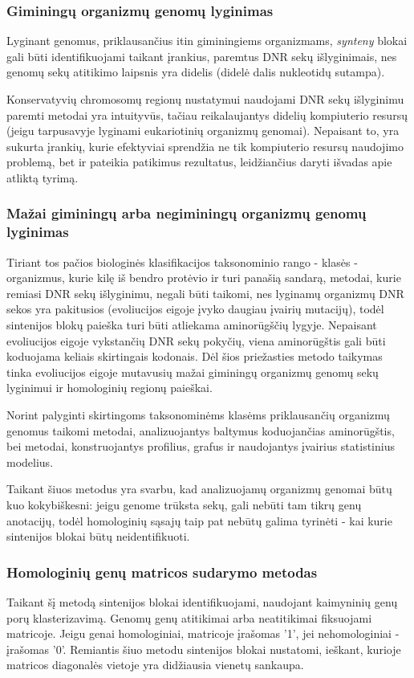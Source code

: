 \documentclass[12pt]{article}
\begin{document}
\subsubsection{Giminingų organizmų genomų lyginimas}
Lyginant genomus, priklausančius itin giminingiems organizmams, \emph{synteny}
blokai gali būti identifikuojami taikant įrankius, paremtus DNR sekų
išlyginimais, nes genomų sekų atitikimo laipsnis yra didelis (didelė dalis
nukleotidų sutampa).

Konservatyvių chromosomų regionų nustatymui naudojami DNR sekų išlyginimu
paremti metodai yra intuityvūs, tačiau reikalaujantys didelių kompiuterio
resursų (jeigu tarpusavyje lyginami eukariotinių organizmų genomai). Nepaisant
to, yra sukurta įrankių, kurie efektyviai sprendžia ne tik kompiuterio resursų
naudojimo problemą, bet ir pateikia patikimus rezultatus, leidžiančius daryti
išvadas apie atliktą tyrimą.

\subsubsection{Mažai giminingų arba negiminingų organizmų genomų lyginimas}
Tiriant tos pačios biologinės klasifikacijos taksonominio rango - klasės -
organizmus, kurie kilę iš bendro protėvio ir turi panašią sandarą, metodai, 
kurie remiasi DNR sekų išlyginimu, negali būti taikomi, nes lyginamų organizmų
DNR sekos yra pakitusios (evoliucijos eigoje įvyko daugiau įvairių mutacijų),
todėl sintenijos blokų paieška turi būti atliekama aminorūgščių lygyje.
Nepaisant evoliucijos eigoje vykstančių DNR sekų pokyčių, viena aminorūgštis
gali būti koduojama keliais skirtingais kodonais. Dėl šios priežasties metodo
taikymas tinka evoliucijos eigoje mutavusių mažai giminingų organizmų genomų
sekų lyginimui ir homologinių regionų paieškai.

Norint palyginti skirtingoms taksonominėms klasėms priklausančių organizmų
genomus taikomi metodai, analizuojantys baltymus koduojančias aminorūgštis,
bei metodai, konstruojantys profilius, grafus ir naudojantys įvairius
statistinius modelius.

Taikant šiuos metodus yra svarbu, kad analizuojamų organizmų genomai būtų kuo
kokybiškesni: jeigu genome trūksta sekų, gali nebūti tam tikrų genų anotacijų,
todėl homologinių sąsajų taip pat nebūtų galima tyrinėti - kai kurie sintenijos
blokai būtų neidentifikuoti.

\subsubsection*{Homologinių genų matricos sudarymo metodas}
Taikant šį metodą sintenijos blokai identifikuojami, naudojant kaimyninių genų
porų klasterizavimą. Genomų genų atitikimai arba neatitikimai fiksuojami
matricoje. Jeigu genai homologiniai, matricoje įrašomas '1', jei nehomologiniai
- įrašomas '0'. Remiantis šiuo metodu sintenijos blokai nustatomi, ieškant,
kurioje matricos diagonalės vietoje yra didžiausia vienetų sankaupa.
\end{document}
